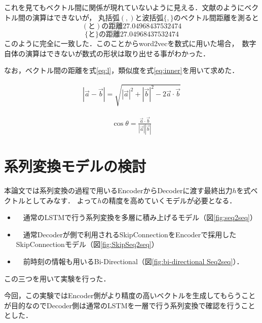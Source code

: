 \documentclass[a4j,11pt,report]{jsbook}
\begin{document}
これを見てもベクトル間に関係が現れていないように見える．文献\cite{seq2seq}のようにベクトル間の演算はできないが，
丸括弧$( , )$と波括弧$\{ , \}$のベクトル間距離を測ると
\[
(　と　) の距離 27.04968437532474
\]
\[
\{　と　\} の距離 27.04968437532474
\]
このように完全に一致した．このことからword2vecを数式に用いた場合，　数字自体の演算はできないが数式の形状は取り出せる事がわかった．

なお，ベクトル間の距離を式\ref{eq:l}，類似度を式\ref{eq:inner}を用いて求めた．

\begin{equation}
  \label{eq:l}
  \begin{split}
    |\vec{a}-\vec{b}| =  \sqrt{|\vec{a}|^2 + |\vec{b}|^2 - 2  \vec{a} \cdot \vec{b}}
  \end{split}
\end{equation}

\begin{equation}
  \label{eq:inner}
  \begin{split}
    \cos \theta = \frac{\vec{a} \cdot \vec{b}}{|\vec{a}| |\vec{b}|}
  \end{split}
\end{equation}

\section{系列変換モデルの検討}
本論文では系列変換の過程で用いるEncoderからDecoderに渡す最終出力$h$を式ベクトルとしてみなす．
よって$h$の精度を高めていくモデルが必要となる．
\begin{itemize}
  \item　通常のLSTMで行う系列変換を多層に積み上げるモデル（図\ref{fig:seq2seq}）
  \item　通常Decoderが側で利用されるSkipConnectionをEncoderで採用したSkipConnectionモデル（図\ref{fig:SkipSeq2seq}）
  \item　前時刻の情報も用いるBi-Directional（図\ref{fig:bi-directional Seq2seq}）．

\end{itemize}
この三つを用いて実験を行った．

今回，この実験ではEncoder側がより精度の高いベクトルを生成してもらうことが目的なのでDecoder側は通常のLSTMを一層で行う系列変換で確認を行うこととした．
\end{document}
